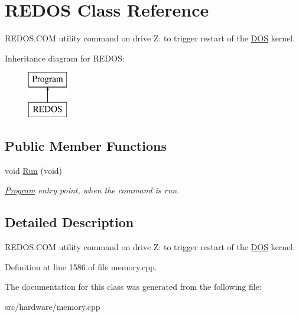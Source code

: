 \hypertarget{classREDOS}{\section{R\-E\-D\-O\-S Class Reference}
\label{classREDOS}
}


R\-E\-D\-O\-S.\-C\-O\-M utility command on drive Z\-: to trigger restart of the \hyperlink{classDOS}{D\-O\-S} kernel.  


Inheritance diagram for R\-E\-D\-O\-S\-:\begin{figure}[H]
\begin{center}
\leavevmode
\includegraphics[height=2.000000cm]{classREDOS}
\end{center}
\end{figure}
\subsection*{Public Member Functions}
\begin{DoxyCompactItemize}
\item 
\hypertarget{classREDOS_aa2d659599de1058d1b59069bfad7da76}{void \hyperlink{classREDOS_aa2d659599de1058d1b59069bfad7da76}{Run} (void)}\label{classREDOS_aa2d659599de1058d1b59069bfad7da76}

\begin{DoxyCompactList}\small\item\em \hyperlink{classProgram}{Program} entry point, when the command is run. \end{DoxyCompactList}\end{DoxyCompactItemize}


\subsection{Detailed Description}
R\-E\-D\-O\-S.\-C\-O\-M utility command on drive Z\-: to trigger restart of the \hyperlink{classDOS}{D\-O\-S} kernel. 

Definition at line 1586 of file memory.\-cpp.



The documentation for this class was generated from the following file\-:\begin{DoxyCompactItemize}
\item 
src/hardware/memory.\-cpp\end{DoxyCompactItemize}
